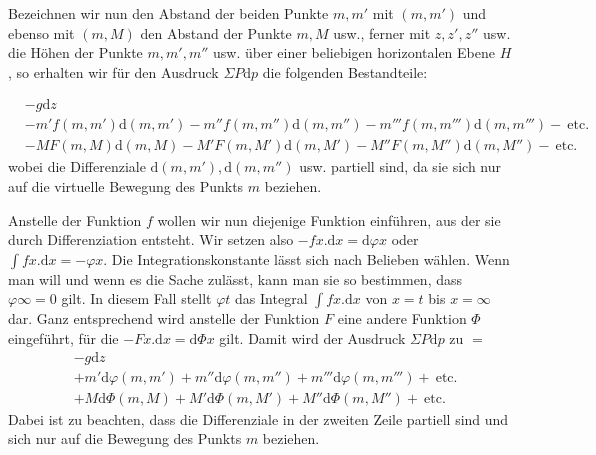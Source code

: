Bezeichnen wir nun den Abstand der beiden Punkte $m,m'$ mit $(m,m')$ und ebenso mit $(m,M)$ den Abstand der Punkte $m,M$ usw., ferner mit $z,z',z''$ usw. die Höhen der Punkte $m,m',m''$ usw. über einer beliebigen horizontalen Ebene $H$, so erhalten wir für den Ausdruck $\Sigma P\mathrm{d}p$ die folgenden Bestandteile:
\par\begingroup\small
\[
\begin{aligned}
&-g\mathrm{d}z\\
&-m'f(m,m')\mathrm{d}(m,m')-m''f(m,m'')\mathrm{d}(m,m'')-m'''f(m,m''')\mathrm{d}(m,m''')-\ \text{etc.}\\
&-MF(m,M)\mathrm{d}(m,M)-M'F(m,M')\mathrm{d}(m,M')-M''F(m,M'')\mathrm{d}(m,M'')-\ \text{etc.}
\end{aligned}
\]
\endgroup
wobei die Differenziale $\mathrm{d}(m,m'),\mathrm{d}(m,m'')$ usw. partiell sind, da sie sich nur auf die virtuelle Bewegung des Punkts $m$ beziehen.

Anstelle der Funktion $f$ wollen wir nun diejenige Funktion einführen, aus der sie durch Differenziation entsteht. Wir setzen also $-fx.\mathrm{d}x=\mathrm{d}\varphi x$ oder $\int fx.\mathrm{d}x=-\varphi x$. Die Integrationskonstante lässt sich nach Belieben wählen. Wenn man will und wenn es die Sache zulässt, kann man sie so bestimmen, dass $\varphi\infty=0$ gilt. In diesem Fall stellt $\varphi t$ das Integral $\int fx.\mathrm{d}x$ von $x=t$ bis $x=\infty$ dar. Ganz entsprechend wird anstelle der Funktion $F$ eine andere Funktion $\Phi$ eingeführt, für die $-Fx.\mathrm{d}x=\mathrm{d}\Phi x$ gilt. Damit wird der Ausdruck $\Sigma P\mathrm{d}p$ zu $=$
\[
\begin{aligned}
&-g\mathrm{d}z\\
&+m'\mathrm{d}\varphi(m,m')+m''\mathrm{d}\varphi(m,m'')+m'''\mathrm{d}\varphi(m,m''')+\ \text{etc.}\\
&+M\mathrm{d}\Phi(m,M)+M'\mathrm{d}\Phi(m,M')+M''\mathrm{d}\Phi(m,M'')+\ \text{etc.}
\end{aligned}
\]
Dabei ist zu beachten, dass die Differenziale in der zweiten Zeile partiell sind und sich nur auf die Bewegung des Punkts $m$ beziehen.

